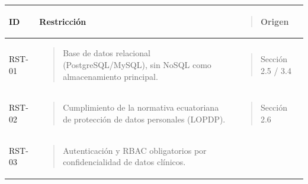 \documentclass[
]{article}
\newcounter{none} %
\begin{document}
{\def\LTcaptype{none} %
\begin{longtable}[]{@{}
  >{\raggedright\arraybackslash}p{}
  >{\raggedright\arraybackslash}p{}
  >{\raggedright\arraybackslash}p{}@{}}
\toprule\noalign{}
\begin{minipage}[b]{\linewidth}\centering
\textbf{ID}
\end{minipage} & \begin{minipage}[b]{\linewidth}\centering
\textbf{Restricción}
\end{minipage} & \begin{minipage}[b]{\linewidth}\raggedright
\begin{quote}
\textbf{Origen}
\end{quote}
\end{minipage} \\
\midrule\noalign{}
\endhead
\bottomrule\noalign{}
\endlastfoot
RST-01 & \begin{minipage}[t]{\linewidth}\raggedright
\begin{quote}
Base de datos relacional (PostgreSQL/MySQL), sin NoSQL como
almacenamiento principal.
\end{quote}
\end{minipage} & \begin{minipage}[t]{\linewidth}\raggedright
\begin{quote}
Sección 2.5 / 3.4
\end{quote}
\end{minipage} \\
RST-02 & \begin{minipage}[t]{\linewidth}\raggedright
\begin{quote}
Cumplimiento de la normativa ecuatoriana de protección de datos
personales (LOPDP).
\end{quote}
\end{minipage} & \begin{minipage}[t]{\linewidth}\raggedright
\begin{quote}
Sección 2.6
\end{quote}
\end{minipage} \\
RST-03 & \begin{minipage}[t]{\linewidth}\raggedright
\begin{quote}
Autenticación y RBAC obligatorios por confidencialidad de datos
clínicos.
\end{quote}

\end{minipage}
\end{longtable}}
\end{document}
